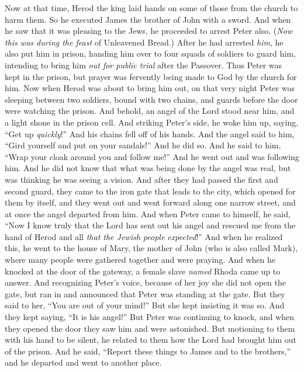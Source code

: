 \begin{biblechapter} %
 Now at that time, Herod the king laid hands on some of those from the church to harm them.
\verse So he executed James the brother of John with a sword.
\verse And when he saw that it was pleasing to the Jews, he proceeded to arrest Peter also. (\textit{Now this was during the feast} of Unleavened Bread.)
\verse After he had arrested \textit{him}, he also put him in prison, handing him over to four squads of soldiers to guard him, intending to bring him \textit{out for public trial} after the Passover.
\verse Thus Peter was kept in the prison, but prayer was fervently being made to God by the church for him.
 Now when Herod was about to bring him out, on that very night Peter was sleeping between two soldiers, bound with two chains, and guards before the door were watching the prison.
\verse And behold, an angel of the Lord stood near him, and a light shone in the prison cell. And striking Peter’s side, he woke him up, saying, “Get up \textit{quickly}!” And his chains fell off of his hands.
\verse And the angel said to him, “Gird yourself and put on your sandals!” And he did so. And he said to him, “Wrap your cloak around you and follow me!”
\verse And he went out and was following him. And he did not know that what was being done by the angel was real, but was thinking he was seeing a vision.
\verse And after they had passed the first and second guard, they came to the iron gate that leads to the city, which opened for them by itself, and they went out and went forward along one narrow street, and at once the angel departed from him.
\verse And when Peter came to himself, he said, “Now I know truly that the Lord has sent out his angel and rescued me from the hand of Herod and all \textit{that the Jewish people expected}!”
\verse And when he realized this, he went to the house of Mary, the mother of John (who is also called Mark), where many people were gathered together and were praying.
\verse And when he knocked at the door of the gateway, a female slave \textit{named} Rhoda came up to answer.
\verse And recognizing Peter’s voice, because of her joy she did not open the gate, but ran in and announced that Peter was standing at the gate.
\verse But they said to her, “You are out of your mind!” But she kept insisting it was so. And they kept saying, “It is his angel!”
\verse But Peter was continuing to knock, and when they opened the door they saw him and were astonished.
\verse But motioning to them with his hand to be silent, he related to them how the Lord had brought him out of the prison. And he said, “Report these things to James and to the brothers,” and he departed and went to another place.

\end{biblechapter}
